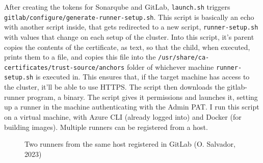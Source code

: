 \documentclass[11pt]{article}
\begin{document}
\begin{flushleft}
    After creating the tokens for Sonarqube and GitLab, \texttt{launch.sh} triggers \texttt{gitlab/configure/generate-runner-setup.sh}. This script is basically an echo with another script inside, that gets redirected to a new script, \texttt{runner-setup.sh} with values that change on each setup of the cluster. Into this script, it's parent copies the contents of the certificate, as text, so that the child, when executed, prints them to a file, and copies this file into the \texttt{/usr/share/ca-certificates/trust-source/anchors} folder of whichever machine \texttt{runner-setup.sh} is executed in. This ensures that, if the target machine has access to the cluster, it'll be able to use HTTPS. The script then downloads the gitlab-runner program, a binary. The script gives it permissions and launches it, setting up a runner in the machine authenticating with the Admin PAT. I run this script on a virtual machine, with Azure CLI (already logged into) and Docker (for building images). Multiple runners can be registered from a host.
    \linebreak
    
        \begin{figure}[htb]
    		\centering
    		\caption{Two runners from the same host registered in GitLab (O. Salvador, 2023)}
    	\end{figure}


    \clearpage

\end{flushleft}
\end{document}
